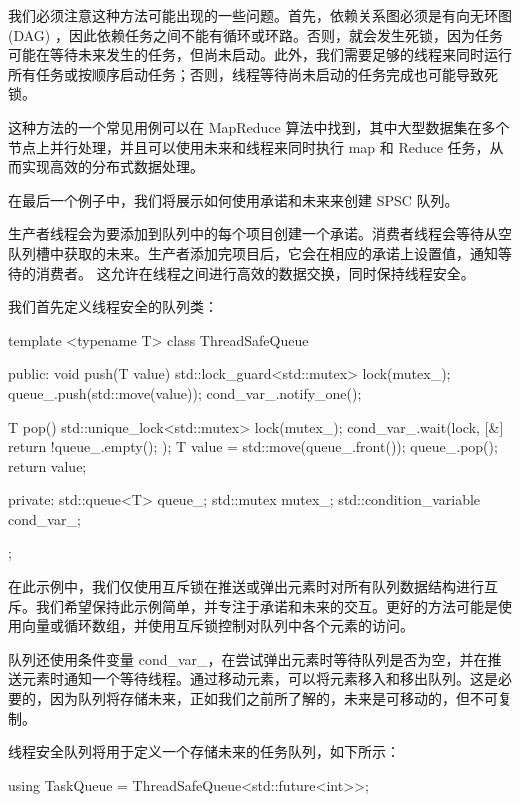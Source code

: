 我们必须注意这种方法可能出现的一些问题。首先，依赖关系图必须是有向无环图 (DAG) ，因此依赖任务之间不能有循环或环路。否则，就会发生死锁，因为任务可能在等待未来发生的任务，但尚未启动。此外，我们需要足够的线程来同时运行所有任务或按顺序启动任务；否则，线程等待尚未启动的任务完成也可能导致死锁。

这种方法的一个常见用例可以在 MapReduce 算法中找到，其中大型数据集在多个节点上并行处理，并且可以使用未来和线程来同时执行 map 和 Reduce 任务，从而实现高效的分布式数据处理。


在最后一个例子中，我们将展示如何使用承诺和未来来创建 SPSC 队列。

生产者线程会为要添加到队列中的每个项目创建一个承诺。消费者线程会等待从空队列槽中获取的未来。生产者添加完项目后，它会在相应的承诺上设置值，通知等待的消费者。
这允许在线程之间进行高效的数据交换，同时保持线程安全。

我们首先定义线程安全的队列类：

\begin{cpp}
template <typename T>
class ThreadSafeQueue {
public:
    void push(T value) {
        std::lock_guard<std::mutex> lock(mutex_);
        queue_.push(std::move(value));
        cond_var_.notify_one();
    }

    T pop() {
        std::unique_lock<std::mutex> lock(mutex_);
        cond_var_.wait(lock, [&]{
            return !queue_.empty();
        });
        T value = std::move(queue_.front());
        queue_.pop();
        return value;
    }

private:
    std::queue<T> queue_;
    std::mutex mutex_;
    std::condition_variable cond_var_;
};
\end{cpp}

在此示例中，我们仅使用互斥锁在推送或弹出元素时对所有队列数据结构进行互斥。我们希望保持此示例简单，并专注于承诺和未来的交互。更好的方法可能是使用向量或循环数组，并使用互斥锁控制对队列中各个元素的访问。

队列还使用条件变量 cond\_var\_，在尝试弹出元素时等待队列是否为空，并在推送元素时通知一个等待线程。通过移动元素，可以将元素移入和移出队列。这是必要的，因为队列将存储未来，正如我们之前所了解的，未来是可移动的，但不可复制。

线程安全队列将用于定义一个存储未来的任务队列，如下所示：

\begin{cpp}
using TaskQueue = ThreadSafeQueue<std::future<int>>;
\end{cpp}

